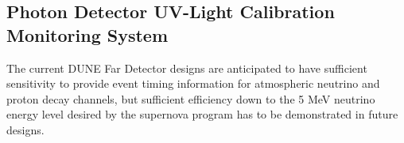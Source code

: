
\subsection{Photon Detector UV-Light Calibration Monitoring System}
\label{sec_pd_calib}


	The current DUNE Far Detector designs are anticipated to have sufficient sensitivity to provide event timing information for atmospheric neutrino and proton decay channels, but sufficient efficiency down to the 5 MeV neutrino energy level desired by the supernova program has to be demonstrated in future designs.

